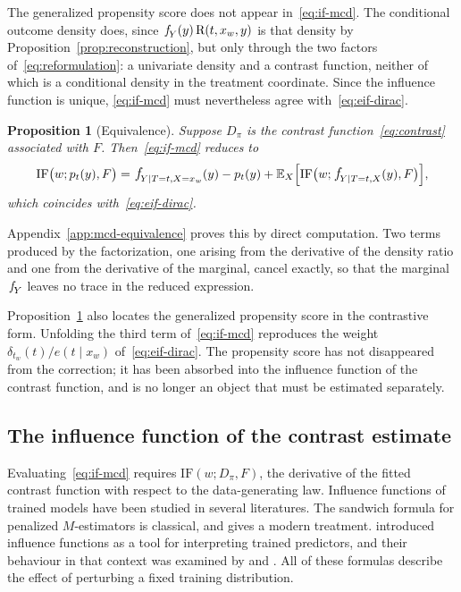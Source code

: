\documentclass[11pt]{article}
\theoremstyle{plain}
\newtheorem{mypropo}{Proposition}
\theoremstyle{definition}
\theoremstyle{remark}
\newcommand{\pE}{\ensuremath{\mathbb{E}}}
\newcommand{\pf}[1]{\ensuremath{\,\mathlarger{\textit{f}}_{#1}}}
\newcommand{\ratio}{\ensuremath{\pi}}
\newcommand{\contrast}{D_{\ratio}}
\newcommand{\DensityRatio}{\text{R}}
\newcommand{\IF}{\mathrm{IF}}
\newcommand{\gps}{e}
\begin{document}
The generalized propensity score does not appear in~\eqref{eq:if-mcd}. The conditional
outcome density does, since $\pf{Y}(y)\,\DensityRatio(t,x_w,y)$ is that density by
Proposition~\ref{prop:reconstruction}, but only through the two factors
of~\eqref{eq:reformulation}: a univariate density and a contrast function, neither of
which is a conditional density in the treatment coordinate. Since the influence function
is unique, \eqref{eq:if-mcd} must nevertheless agree with~\eqref{eq:eif-dirac}.

\begin{mypropo}[Equivalence]
\label{prop:equivalence}
Suppose $\contrast$ is the contrast function~\eqref{eq:contrast} associated with $F$.
Then~\eqref{eq:if-mcd} reduces to
\begin{equation}
\IF\big(w;p_t(y),F\big)
= \pf{Y \mid T=t,X=x_w}(y) - p_t(y)
+ \pE_X\Big[\IF\big(w;\pf{Y \mid T=t,X}(y),F\big)\Big],
\label{eq:if-collapsed}
\end{equation}
which coincides with~\eqref{eq:eif-dirac}.
\end{mypropo}

Appendix~\ref{app:mcd-equivalence} proves this by direct computation. Two terms produced
by the factorization, one arising from the derivative of the density ratio and one from
the derivative of the marginal, cancel exactly, so that the marginal $\pf{Y}$ leaves no
trace in the reduced expression.

Proposition~\ref{prop:equivalence} also locates the generalized propensity score in the
contrastive form. Unfolding the third term of~\eqref{eq:if-mcd} reproduces the weight
$\delta_{t_w}(t)/\gps(t \mid x_w)$ of~\eqref{eq:eif-dirac}. The propensity score has not
disappeared from the correction; it has been absorbed into the influence function of the
contrast function, and is no longer an object that must be estimated separately.

\subsection{The influence function of the contrast estimate}
\label{sec:mcd-if-classifier}

Evaluating~\eqref{eq:if-mcd} requires $\IF(w;\contrast,F)$, the derivative of the fitted
contrast function with respect to the data-generating law. Influence functions of trained
models have been studied in several literatures. The sandwich formula for penalized
$M$-estimators is classical, and \citet{avella2017} gives a modern treatment.
\citet{kohliang2017} introduced influence functions as a tool for interpreting trained
predictors, and their behaviour in that context was examined by \citet{basu2021} and
\citet{bae2022}. All of these formulas describe the effect of perturbing a fixed training
distribution.
\end{document}
